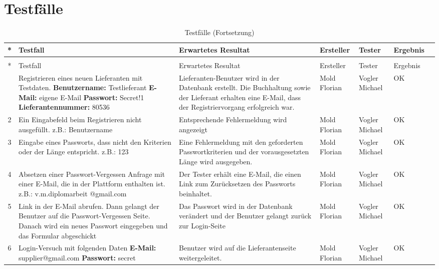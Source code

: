 \chapter{Testfälle}
\begin{longtable}[h]{| c | p{3.7cm} | p{3.8cm} | l | l | l | c |}
\caption{Testfälle}\label{tab:Testfaelle}\\ 
\toprule
* & Testfall & Erwartetes Resultat & Ersteller & Tester & Ergebnis \\          
\midrule
\endfirsthead
\caption[]{Testfälle \small(Fortsetzung)}\\
\toprule
* & Testfall & Erwartetes Resultat & Ersteller & Tester & Ergebnis \\
\midrule
\endhead
\midrule
\endfoot 
\bottomrule
\endlastfoot 
\hline
1 & Registrieren eines neuen Lieferanten mit Testdaten. \textbf{Benutzername:} Testlieferant \textbf{E-Mail:} eigene E-Mail \textbf{Passwort:} Secret!1 \textbf{Lieferantennummer:} 80536 & Lieferanten-Benutzer wird in der Datenbank erstellt. Die Buchhaltung sowie der Lieferant erhalten eine E-Mail, dass der Registriervorgang erfolgreich war. & Mold Florian & Vogler Michael & OK \\ \hline

2 & Ein Eingabefeld beim Registrieren nicht ausgefüllt. z.B.: Benutzername & Entsprechende Fehlermeldung wird angezeigt & Mold Florian  & Vogler Michael & OK \\ \hline

3 & Eingabe eines Passworts, dass nicht den Kriterien oder der Länge entspricht. z.B.: 123 & Eine Fehlermeldung mit den geforderten Passwortkriterien und der vorausgesetzten Länge wird ausgegeben. & Mold Florian & Vogler Michael & OK \\ \hline

4 & Absetzen einer Passwort-Vergessen Anfrage mit einer E-Mail, die in der Plattform enthalten ist. z.B.: v.m.diplomarbeit @gmail.com & Der Tester erhält eine E-Mail, die einen Link zum Zurücksetzen des Passworts beinhaltet. & Mold Florian & Vogler Michael & OK \\ \hline

5 & Link in der E-Mail abrufen. Dann gelangt der Benutzer auf die Passwort-Vergessen Seite. Danach wird ein neues Passwort eingegeben und das Formular abgeschickt & Das Passwort wird in der Datenbank verändert und der Benutzer gelangt zurück zur Login-Seite & Mold Florian & Vogler Michael & OK \\ \hline

6 & Login-Versuch mit folgenden Daten \textbf{E-Mail:} supplier@gmail.com \textbf{Passwort:} secret & Benutzer wird auf die Lieferantenseite weitergeleitet. & Mold Florian & Vogler Michael & OK \\ \hline


\end{longtable}
